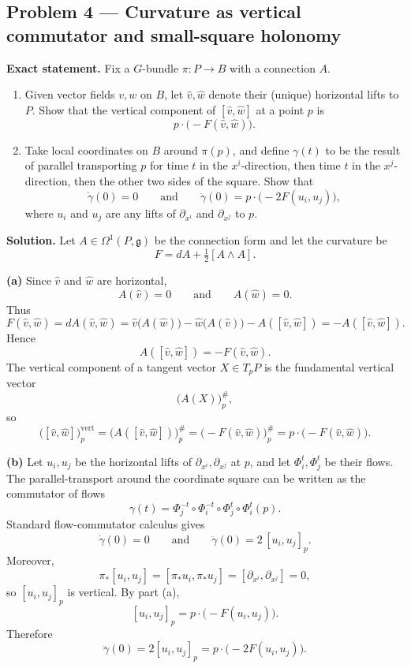 \documentclass[12pt,a4paper]{article}
\theoremstyle{plain}
\theoremstyle{definition}      %
\begin{document}
\subsection*{Problem 4 — Curvature as vertical commutator and small-square holonomy}

\textbf{Exact statement.}
Fix a $G$-bundle $\pi:P\to B$ with a connection $A$.
\begin{enumerate}[label=(\alph*)]
	\item Given vector fields $v,w$ on $B$, let $\hat v,\hat w$ denote their (unique) horizontal lifts to $P$.
	Show that the vertical component of $[\hat v,\hat w]$ at a point $p$ is
	\[
	p\cdot\bigl(-F(\hat v,\hat w)\bigr).
	\]
	\item Take local coordinates on $B$ around $\pi(p)$, and define $\gamma(t)$ to be the result of parallel transporting $p$
	for time $t$ in the $x^i$-direction, then time $t$ in the $x^j$-direction, then the other two sides of the square.
	Show that
	\[
	\dot\gamma(0)=0
	\qquad\text{and}\qquad
	\ddot\gamma(0)=p\cdot\bigl(-2F(u_i,u_j)\bigr),
	\]
	where $u_i$ and $u_j$ are any lifts of $\partial_{x^i}$ and $\partial_{x^j}$ to $p$.
\end{enumerate}

\textbf{Solution.}
Let $A\in\Omega^1(P,\mathfrak{g})$ be the connection form and let the curvature be
\[
F=dA+\tfrac12[A\wedge A].
\]

\textbf{(a)}
Since $\hat v$ and $\hat w$ are horizontal,
\[
A(\hat v)=0
\qquad\text{and}\qquad
A(\hat w)=0.
\]
Thus
\[
F(\hat v,\hat w)
=
dA(\hat v,\hat w)
=
\hat v\bigl(A(\hat w)\bigr)-\hat w\bigl(A(\hat v)\bigr)-A([\hat v,\hat w])
=
-A([\hat v,\hat w]).
\]
Hence
\[
A([\hat v,\hat w])=-F(\hat v,\hat w).
\]
The vertical component of a tangent vector $X\in T_pP$ is the fundamental vertical vector
\[
\bigl(A(X)\bigr)^\#_p,
\]
so
\[
\bigl([\hat v,\hat w]\bigr)^{\mathrm{vert}}_p
=
\bigl(A([\hat v,\hat w])\bigr)^\#_p
=
\bigl(-F(\hat v,\hat w)\bigr)^\#_p
=
p\cdot\bigl(-F(\hat v,\hat w)\bigr).
\]

\textbf{(b)}
Let $u_i,u_j$ be the horizontal lifts of $\partial_{x^i},\partial_{x^j}$ at $p$, and let $\Phi_i^t,\Phi_j^t$ be their flows.
The parallel-transport around the coordinate square can be written as the commutator of flows
\[
\gamma(t)
=
\Phi_j^{-t}\circ \Phi_i^{-t}\circ \Phi_j^{t}\circ \Phi_i^{t}(p).
\]
Standard flow-commutator calculus gives
\[
\dot\gamma(0)=0
\qquad\text{and}\qquad
\ddot\gamma(0)=2\,[u_i,u_j]_p.
\]
Moreover,
\[
\pi_*[u_i,u_j]=[\pi_*u_i,\pi_*u_j]=[\partial_{x^i},\partial_{x^j}]=0,
\]
so $[u_i,u_j]_p$ is vertical. By part (a),
\[
[u_i,u_j]_p
=
p\cdot\bigl(-F(u_i,u_j)\bigr).
\]
Therefore
\[
\ddot\gamma(0)
=
2[u_i,u_j]_p
=
p\cdot\bigl(-2F(u_i,u_j)\bigr).
\]
\end{document}
